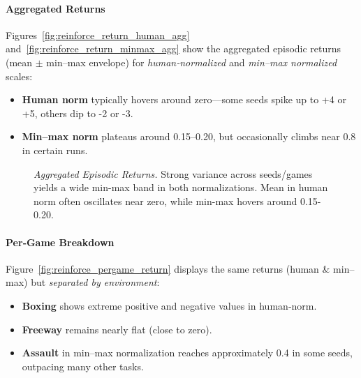 \paragraph{Aggregated Returns}
Figures~\ref{fig:reinforce_return_human_agg} and~\ref{fig:reinforce_return_minmax_agg} show the aggregated episodic returns (mean $\pm$ min–max envelope) 
for \emph{human‐normalized} and \emph{min--max normalized} scales:
\begin{itemize}
	\item \textbf{Human norm} typically hovers around zero—some seeds spike up to +4 or +5, others dip to -2 or -3.
	\item \textbf{Min--max norm} plateaus around 0.15--0.20, but occasionally climbs near 0.8 in certain runs.
\end{itemize}

\begin{figure}
	\centering
	\quad
	\caption{\textit{Aggregated Episodic Returns.} 
		Strong variance across seeds/games yields a wide min-max band in both normalizations. 
		Mean in human norm often oscillates near zero, while min-max hovers around 0.15-0.20.}
	\label{fig:reinforce_returns_agg}
\end{figure}

\paragraph{Per‐Game Breakdown}
Figure~\ref{fig:reinforce_pergame_return} displays the same returns (human \& min--max) 
but \emph{separated by environment}:
\begin{itemize}
	\item \textbf{Boxing} shows extreme positive and negative values in human‐norm.
	\item \textbf{Freeway} remains nearly flat (close to zero).
	\item \textbf{Assault} in min--max normalization reaches approximately 0.4 in some seeds, outpacing many other tasks.
\end{itemize}

